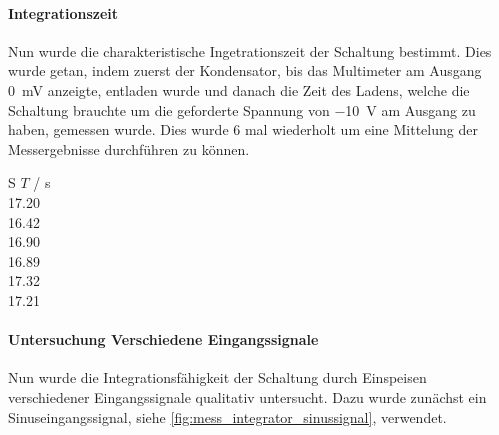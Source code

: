 \documentclass[12pt,english,ngerman]{scrartcl}
\begin{document}
\paragraph{Integrationszeit}
Nun wurde die charakteristische Ingetrationszeit der Schaltung bestimmt. Dies wurde
getan, indem zuerst der Kondensator, bis das Multimeter am Ausgang \SI{0}{\mV} anzeigte,
entladen wurde und danach die Zeit des Ladens, welche die Schaltung brauchte
um die geforderte Spannung von \SI{-10}{\volt} am Ausgang zu haben, gemessen wurde.
Dies wurde 6 mal wiederholt um eine Mittelung der Messergebnisse durchführen zu
können.

\begin{table}[H]
  \caption{Messungen der Integrationszeit der realen Integratorschaltung aus
  \autoref{fig:sim_integrator_schaltung}, wobei $T$ die Ladezeit ist, bis am Ausgang
  \SI{-10}{\volt} anliegt. Bei einer Ladespannung \SI{91.8}{\milli\volt}, einem
  Widerstand von \SI{21.9}{\kilo\ohm} und einer Kapazität von
  \SI{6.8}{\micro\farad} }
  \label{tab:messungen_integration}
  \centering
  \begin{tabular}[c]{S}
    {$T$ / \si{\second}} \\
    17.20 \\
    16.42 \\
    16.90 \\
    16.89 \\
    17.32 \\
    17.21 \\
  \end{tabular}
\end{table}


\paragraph{Untersuchung Verschiedene Eingangssignale}
Nun wurde die Integrationsfähigkeit der Schaltung durch Einspeisen
verschiedener Eingangssignale qualitativ untersucht. Dazu wurde zunächst ein
Sinuseingangssignal, siehe \autoref{fig:mess_integrator_sinussignal}, verwendet.
 
\end{document}
